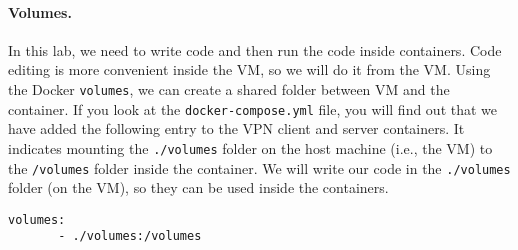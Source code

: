 
\paragraph{Volumes.} In this lab, we need to write code and then run
the code inside containers. Code editing is more convenient inside
the VM, so we will do it from the VM. Using the Docker \texttt{volumes},
we can create a shared folder between VM and the container.
If you look at the \texttt{docker-compose.yml} file, you will find out that
we have added the following entry to the VPN client and server containers.
It indicates mounting the \texttt{./volumes} folder on the host
machine (i.e., the VM) to the \texttt{/volumes} folder inside the container.
We will write our code in the \texttt{./volumes} folder (on the VM), so they
can be used inside the containers.

\begin{lstlisting}
volumes:
       - ./volumes:/volumes
\end{lstlisting}

